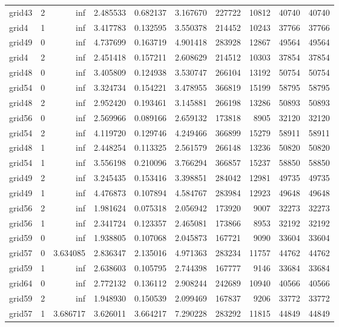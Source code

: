 \begin{longtable}{|l|r|r|r|r|r|r|r|r|r|}
grid43 & 2 & inf & 2.485533 & 0.682137 & 3.167670 & 227722 & 10812 & 40740 & 40740 \\
grid4 & 1 & inf & 3.417783 & 0.132595 & 3.550378 & 214452 & 10243 & 37766 & 37766 \\
grid49 & 0 & inf & 4.737699 & 0.163719 & 4.901418 & 283928 & 12867 & 49564 & 49564 \\
grid4 & 2 & inf & 2.451418 & 0.157211 & 2.608629 & 214512 & 10303 & 37854 & 37854 \\
grid48 & 0 & inf & 3.405809 & 0.124938 & 3.530747 & 266104 & 13192 & 50754 & 50754 \\
grid54 & 0 & inf & 3.324734 & 0.154221 & 3.478955 & 366819 & 15199 & 58795 & 58795 \\
grid48 & 2 & inf & 2.952420 & 0.193461 & 3.145881 & 266198 & 13286 & 50893 & 50893 \\
grid56 & 0 & inf & 2.569966 & 0.089166 & 2.659132 & 173818 & 8905 & 32120 & 32120 \\
grid54 & 2 & inf & 4.119720 & 0.129746 & 4.249466 & 366899 & 15279 & 58911 & 58911 \\
grid48 & 1 & inf & 2.448254 & 0.113325 & 2.561579 & 266148 & 13236 & 50820 & 50820 \\
grid54 & 1 & inf & 3.556198 & 0.210096 & 3.766294 & 366857 & 15237 & 58850 & 58850 \\
grid49 & 2 & inf & 3.245435 & 0.153416 & 3.398851 & 284042 & 12981 & 49735 & 49735 \\
grid49 & 1 & inf & 4.476873 & 0.107894 & 4.584767 & 283984 & 12923 & 49648 & 49648 \\
grid56 & 2 & inf & 1.981624 & 0.075318 & 2.056942 & 173920 & 9007 & 32273 & 32273 \\
grid56 & 1 & inf & 2.341724 & 0.123357 & 2.465081 & 173866 & 8953 & 32192 & 32192 \\
grid59 & 0 & inf & 1.938805 & 0.107068 & 2.045873 & 167721 & 9090 & 33604 & 33604 \\
grid57 & 0 & 3.634085 & 2.836347 & 2.135016 & 4.971363 & 283234 & 11757 & 44762 & 44762 \\
grid59 & 1 & inf & 2.638603 & 0.105795 & 2.744398 & 167777 & 9146 & 33684 & 33684 \\
grid64 & 0 & inf & 2.772132 & 0.136112 & 2.908244 & 242689 & 10940 & 40566 & 40566 \\
grid59 & 2 & inf & 1.948930 & 0.150539 & 2.099469 & 167837 & 9206 & 33772 & 33772 \\
grid57 & 1 & 3.686717 & 3.626011 & 3.664217 & 7.290228 & 283292 & 11815 & 44849 & 44849 \\

\end{longtable}
